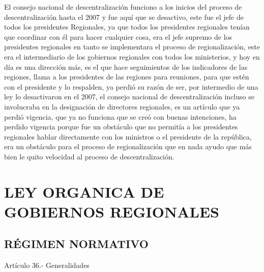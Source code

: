 \documentclass[
  a4paper,
]{article}
\begin{document}
El consejo nacional de descentralización funciono a los inicios del
proceso de descentralización hasta el 2007 y fue aquí que se desactivo,
este fue el jefe de todos los presidentes Regionales, ya que todos los
presidentes regionales tenían que coordinar con él para hacer cualquier
cosa, era el jefe supremo de los presidentes regionales en tanto se
implementara el proceso de regionalización, este era el intermediario de
los gobiernos regionales con todos los ministerios, y hoy en día es una
dirección más, es el que hace seguimientos de los indicadores de las
regiones, llama a los presidentes de las regiones para reuniones, para
que estén con el presidente y lo respalden, ya perdió su razón de ser,
por intermedio de una ley lo desactivaron en el 2007, el consejo
nacional de descentralización incluso se involucraba en la designación
de directores regionales, es un artículo que ya perdió vigencia, que ya
no funciona que se creó con buenas intenciones, ha perdido vigencia
porque fue un obstáculo que no permitía a los presidentes regionales
hablar directamente con los ministros o el presidente de la república,
era un obstáculo para el proceso de regionalización que en nada ayudo
que más bien le quito velocidad al proceso de descentralización.

\hypertarget{ley-organica-de-gobiernos-regionales}{%
\section{LEY ORGANICA DE GOBIERNOS
REGIONALES}\label{ley-organica-de-gobiernos-regionales}}

\hypertarget{ruxe9gimen-normativo}{%
\subsection{RÉGIMEN NORMATIVO}\label{ruxe9gimen-normativo}}

Artículo 36.- Generalidades
\end{document}
